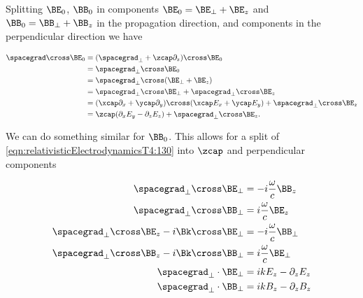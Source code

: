 Splitting $\BE_0$, $\BB_0$ in components $\BE_0 = \BE_\perp + \BE_z$ and $\BB_0 = \BB_\perp + \BB_z$ in the propagation direction, and components in the perpendicular direction we have 

\begin{align*}
\spacegrad \cross \BE_0 
&=
(\spacegrad_\perp + \zcap\partial_z) \cross \BE_0 \\
&=
\spacegrad_\perp \cross \BE_0 \\
&=
\spacegrad_\perp \cross (\BE_\perp + \BE_z) \\
&=
\spacegrad_\perp \cross \BE_\perp 
+\spacegrad_\perp \cross \BE_z \\
&=
( \xcap \partial_x +\ycap \partial_y ) \cross ( \xcap E_x +\ycap E_y ) 
+\spacegrad_\perp \cross \BE_z \\
&=
\zcap (\partial_x E_y - \partial_z E_z) 
+\spacegrad_\perp \cross \BE_z.
\end{align*}

We can do something similar for $\BB_0$.  This allows for a split of \ref{eqn:relativisticElectrodynamicsT4:130} into $\zcap$ and perpendicular components

\begin{align}\label{eqn:relativisticElectrodynamicsT4:130}
\spacegrad_\perp \cross \BE_\perp &= -i \frac{\omega}{c} \BB_z \\
\spacegrad_\perp \cross \BB_\perp &= i \frac{\omega}{c} \BE_z \\
\spacegrad_\perp \cross \BE_z - i \Bk \cross \BE_\perp &= -i \frac{\omega}{c} \BB_\perp \\
\spacegrad_\perp \cross \BB_z - i \Bk \cross \BB_\perp &= i \frac{\omega}{c} \BE_\perp \\
\spacegrad_\perp \cdot \BE_\perp &= i k E_z - \partial_z E_z \\
\spacegrad_\perp \cdot \BB_\perp &= i k B_z - \partial_z B_z
\end{align}


\EndNoBibArticle
